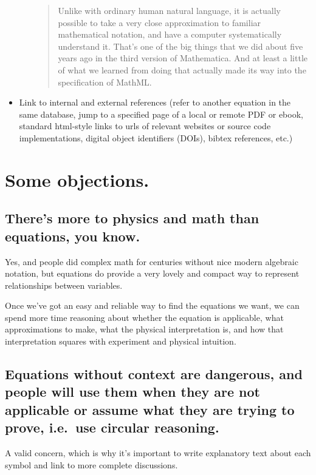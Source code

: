 \documentclass[12pt,letterpaper]{article}
\begin{document}
\begin{itemize}
\begin{enumerate}
\begin{quote}
                Unlike with ordinary human natural language,
                it is actually possible to take a very close approximation to familiar mathematical notation,
                and have a computer systematically understand it.
                That's one of the big things that we did about five years ago in the third version of Mathematica.
                And at least a little of what we learned from doing that actually made its way into the specification of MathML.
                \end{quote}
      \end{enumerate}
\item Link to internal and external references
      (refer to another equation in the same database,
      jump to a specified page of a local or remote PDF or ebook,
      standard html-style links to  urls of relevant websites or source code implementations,
      digital object identifiers (DOIs),
      bibtex references, etc.) \label{itm:linking}
\end{itemize}

\section{Some objections.}

\subsection{There's more to physics and math than equations, you know.}

Yes, and people did complex math for centuries without nice modern algebraic notation,
but equations do provide a very lovely and compact way to represent relationships between variables.

Once we've got an easy and reliable way to find the equations we want,
we can spend more time reasoning about whether the equation is applicable,
what approximations to make,
what the physical interpretation is,
and how that interpretation squares with experiment and physical intuition.

\subsection{Equations without context are dangerous,
            and people will use them when they are not applicable or assume what they are trying to prove,
            i.e.\ use circular reasoning.}

A valid concern,
which is why it's important to write explanatory text about each symbol
and link to more complete discussions.
\end{document}
